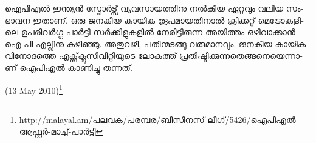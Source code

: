 ഐ­പി­എല്‍ ഇന്ത്യന്‍ സ്പോര്‍­ട്സ് വ്യ­വ­സാ­യ­ത്തി­നു നല്‍­കിയ ഏറ്റ­വും വലിയ സം­ഭാ­വന ഇതാ­ണ്. ഒരു ജന­കീയ കാ­യിക 
രൂ­പ­മാ­യ­തി­നാല്‍ ക്രി­ക്ക­റ്റ് മെ­ട്രോ­ക­ളി­ലെ ഉപ­രി­വര്‍­ഗ്ഗ പാര്‍­ട്ടി സര്‍­ക്കി­ളു­ക­ളില്‍ നേ­രി­ട്ടി­രു­ന്ന അയി­ത്തം ഒഴി­വാ­ക്കാന്‍ 
ഐ പി എല്ലി­നു കഴി­ഞ്ഞു. അതു­വ­ഴി, പതി­ന്മ­ട­ങ്ങു വരു­മാ­ന­വും. ജന­കീയ കാ­യിക വി­നോ­ദ­ത്തെ എക്സ്‌­ക്ലൂ­സി­വി­റ്റി­യു­ടെ ലോ­ക­ത്ത് 
പ്ര­തി­ഷ്ഠി­ക്കു­ന്ന­തെ­ങ്ങ­നെ­യെ­ന്നാ­ണ് ഐപി­എല്‍ കാ­ണി­ച്ചു തന്ന­ത്.

(13 May 2010)\footnote{http://malayal.am/പലവക/പരമ്പര/ബിസിനസ്-ലീഗ്/5426/ഐപിഎല്‍-ആഫ്റ്റര്‍-മാച്ച്-പാര്‍ട്ടി}

\newpage
